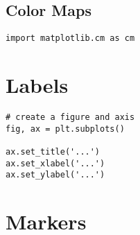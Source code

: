 \subsection{Color Maps}
\begin{verbatim}
import matplotlib.cm as cm
\end{verbatim}

\section{Labels}
\begin{verbatim}
# create a figure and axis
fig, ax = plt.subplots()

ax.set_title('...')
ax.set_xlabel('...')
ax.set_ylabel('...')

\end{verbatim}

\section{Markers}
\label{sec:mplMarkers}
